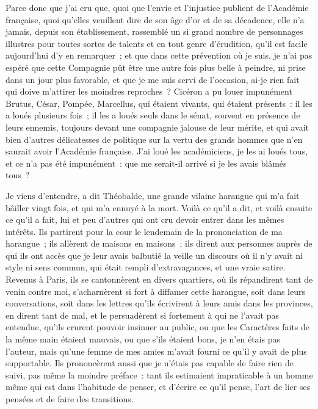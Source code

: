 \documentclass[french,twoside]{book} %
\begin{document}
Parce donc que j’ai cru que, quoi que l’envie et l’injustice publient de l’Académie française, quoi qu’elles veuillent dire de son âge d’or et de sa décadence, elle n’a jamais, depuis son établissement, rassemblé un si grand nombre de personnages illustres pour toutes sortes de talents et en tout genre d’érudition, qu’il est facile aujourd’hui d’y en remarquer ; et que dans cette prévention où je suis, je n’ai pas espéré que cette Compagnie pût être une autre fois plus belle à peindre, ni prise dans un jour plus favorable, et que je me suis servi de l’occasion, ai-je rien fait qui doive m’attirer les moindres reproches ? Cicéron a pu louer impunément Brutus, César, Pompée, Marcellus, qui étaient vivants, qui étaient présents : il les a loués plusieurs fois ; il les a loués seuls dans le sénat, souvent en présence de leurs ennemis, toujours devant une compagnie jalouse de leur mérite, et qui avait bien d’autres délicatesses de politique sur la vertu des grands hommes que n’en saurait avoir l’Académie française. J'ai loué les académiciens, je les ai loués tous, et ce n’a pas été impunément : que me serait-il arrivé si je les avais blâmés tous ?\par
Je viens d’entendre, a dit Théobalde, une grande vilaine harangue qui m’a fait bâiller vingt fois, et qui m’a ennuyé à la mort. Voilà ce qu’il a dit, et voilà ensuite ce qu’il a fait, lui et peu d’autres qui ont cru devoir entrer dans les mêmes intérêts. Ils partirent pour la cour le lendemain de la prononciation de ma harangue ; ils allèrent de maisons en maisons ; ils dirent aux personnes auprès de qui ils ont accès que je leur avais balbutié la veille un discours où il n’y avait ni style ni sens commun, qui était rempli d’extravagances, et une vraie satire. Revenus à Paris, ils se cantonnèrent en divers quartiers, où ils répandirent tant de venin contre moi, s’acharnèrent si fort à diffamer cette harangue, soit dans leurs conversations, soit dans les lettres qu’ils écrivirent à leurs amis dans les provinces, en dirent tant de mal, et le persuadèrent si fortement à qui ne l’avait pas entendue, qu’ils crurent pouvoir insinuer au public, ou que les Caractères faits de la même main étaient mauvais, ou que s’ils étaient bons, je n’en étais pas l’auteur, mais qu’une femme de mes amies m’avait fourni ce qu’il y avait de plus supportable. Ils prononcèrent aussi que je n’étais pas capable de faire rien de suivi, pas même la moindre préface : tant ils estimaient impraticable à un homme même qui est dans l’habitude de penser, et d’écrire ce qu’il pense, l’art de lier ses pensées et de faire des transitions.\par
\end{document}
